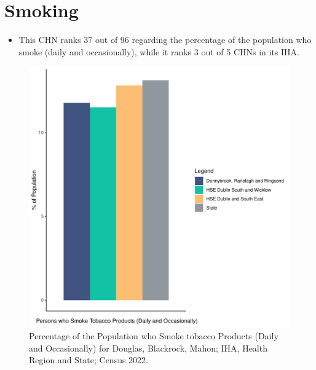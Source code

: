 \documentclass{article}
\begin{document}
\pagebreak

\section{Smoking}\label{sect:Smoking}
\begin{itemize}
\item This CHN ranks  37 out of 96 regarding the percentage of the population who smoke (daily and occasionally), while it ranks   3 out of 5 CHNs in its IHA.
\end{itemize}
\begin{figure}[H]
	\centering
	\includegraphics[width = 120mm]{../figures/SmokingED.pdf}
	\caption{Percentage of the Population who Smoke tobacco Products (Daily and Occasionally) for Douglas, Blackrock, Mahon; IHA, Health Region and State; Census 2022.}
	\label{fig:2ae19629-1a6a-13a3-e055-000000000001}
	\end{figure}
	
\end{document}
